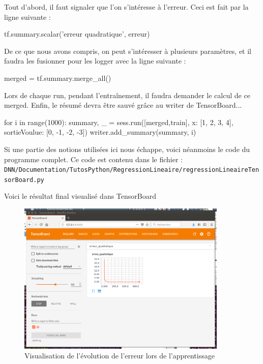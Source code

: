 Tout d'abord, il faut signaler que l'on s'intéresse à l'erreur. Ceci est fait par la ligne suivante :
\begin{mypython}
tf.summary.scalar('erreur quadratique', erreur)
\end{mypython}
De ce que nous avons compris, on peut s’intéresser à plusieurs paramètres, et il faudra les fusionner pour les logger avec la ligne suivante :
\begin{mypython}
merged = tf.summary.merge_all()
\end{mypython}
Lors de chaque run, pendant l’entraînement, il faudra demander le calcul de ce merged. Enfin, le résumé devra être sauvé grâce au writer de TensorBoard... 
\begin{mypython}
for i in range(1000):
  summary, _ = sess.run([merged,train], {x: [1, 2, 3, 4], sortieVoulue: [0, -1, -2, -3]})
  writer.add_summary(summary, i)
\end{mypython}
Si une partie des notions utilisées ici nous échappe, voici néanmoins le code du programme complet. Ce code est contenu dans le fichier :\\
\verb+DNN/Documentation/TutosPython/RegressionLineaire/regressionLineaireTensorBoard.py+



Voici le résultat final visualisé dans TensorBoard
\begin{figure}[H]

\begin{center}
\includegraphics[width=10cm]{./figures/TBScalarRegression.png} 
\end{center}
\caption{Visualisation de l'évolution de l'erreur lors de l'apprentissage}
\end{figure}

